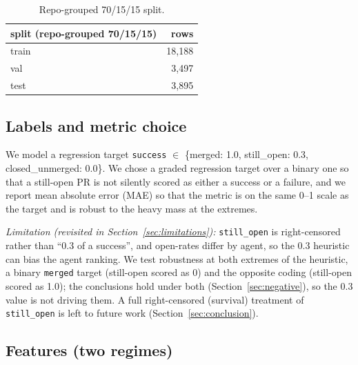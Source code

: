 \documentclass[sigconf,nonacm]{acmart}
\begin{document}
\begin{table}[t]
  \centering
  \caption{Repo-grouped 70/15/15 split.}
  \begin{tabular}{lr}
    \toprule
    split (repo-grouped 70/15/15) & rows \\
    \midrule
    train & 18,188 \\
    val & 3,497 \\
    test & 3,895 \\
    \bottomrule
  \end{tabular}
\end{table}

\subsection{Labels and metric choice}\label{sec:labels}

We model a regression target \texttt{success} $\in$ \{merged: 1.0, still\_open: 0.3, closed\_unmerged: 0.0\}. We chose a graded regression target over a binary one so that a still-open PR is not silently scored as either a success or a failure, and we report mean absolute error (MAE) so that the metric is on the same 0--1 scale as the target and is robust to the heavy mass at the extremes.

\emph{Limitation (revisited in Section~\ref{sec:limitations}):} \texttt{still\_open} is right-censored rather than ``0.3 of a success'', and open-rates differ by agent, so the 0.3 heuristic can bias the agent ranking. We test robustness at both extremes of the heuristic, a binary \texttt{merged} target (still-open scored as 0) and the opposite coding (still-open scored as 1.0); the conclusions hold under both (Section~\ref{sec:negative}), so the 0.3 value is not driving them. A full right-censored (survival) treatment of \texttt{still\_open} is left to future work (Section~\ref{sec:conclusion}).

\subsection{Features (two regimes)}\label{sec:features}
\end{document}
